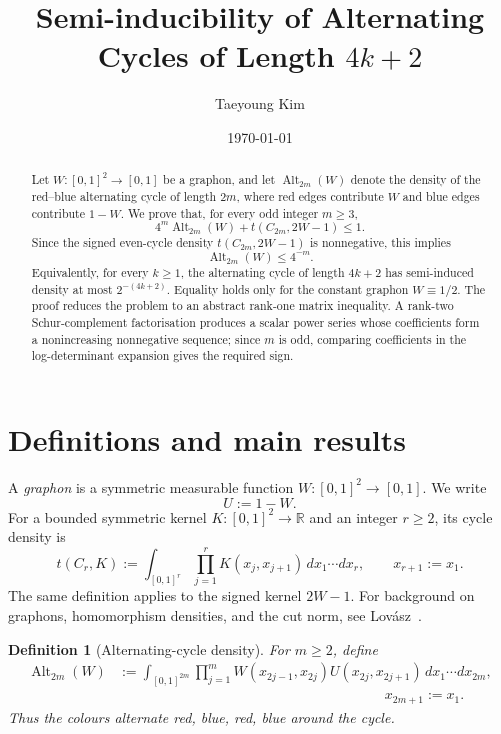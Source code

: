 \documentclass[11pt]{article}
\title{Semi-inducibility of Alternating Cycles of Length
\texorpdfstring{$4k+2$}{4k+2}}
\author{Taeyoung Kim}
\date{\today}
\newtheorem{definition}[theorem]{Definition}
\newcommand{\R}{\mathbb{R}}
\newcommand{\Alt}{\operatorname{Alt}}
\begin{document}
\maketitle

\begin{abstract}
Let $W\colon[0,1]^2\to[0,1]$ be a graphon, and let
$\Alt_{2m}(W)$ denote the density of the red--blue alternating cycle of
length $2m$, where red edges contribute $W$ and blue edges contribute
$1-W$.  We prove that, for every odd integer $m\ge 3$,
\[
  4^m\Alt_{2m}(W)+t(C_{2m},2W-1)\le 1.
\]
Since the signed even-cycle density $t(C_{2m},2W-1)$ is nonnegative,
this implies
\[
  \Alt_{2m}(W)\le 4^{-m}.
\]
Equivalently, for every $k\ge 1$, the alternating cycle of length
$4k+2$ has semi-induced density at most $2^{-(4k+2)}$.  Equality holds
only for the constant graphon $W\equiv 1/2$.  The proof reduces the
problem to an abstract rank-one matrix inequality.  A rank-two
Schur-complement factorisation produces a scalar power series whose
coefficients form a nonincreasing nonnegative sequence; since $m$ is
odd, comparing coefficients in the log-determinant expansion gives the
required sign.
\end{abstract}

\section{Definitions and main results}

A \emph{graphon} is a symmetric measurable function
$W\colon[0,1]^2\to[0,1]$.  We write
\[
  U:=1-W.
\]
For a bounded symmetric kernel $K\colon[0,1]^2\to\R$ and an integer
$r\ge 2$, its cycle density is
\[
  t(C_r,K)
  :=
  \int_{[0,1]^r}
  \prod_{j=1}^{r}K(x_j,x_{j+1})
  \,dx_1\cdots dx_r,
  \qquad x_{r+1}:=x_1.
\]
The same definition applies to the signed kernel $2W-1$.  For
background on graphons, homomorphism densities, and the cut norm, see
Lov\'asz~\cite{Lovasz}.

\begin{definition}[Alternating-cycle density]
For $m\ge 2$, define
\begin{align*}
  \Alt_{2m}(W)
  &:={}
  \int_{[0,1]^{2m}}
  \prod_{j=1}^{m}
  W(x_{2j-1},x_{2j})
  U(x_{2j},x_{2j+1})
  \,dx_1\cdots dx_{2m},
  \\
  &\hspace{8cm} x_{2m+1}:=x_1.
\end{align*}
Thus the colours alternate red, blue, red, blue around the cycle.
\end{definition}
\end{document}
